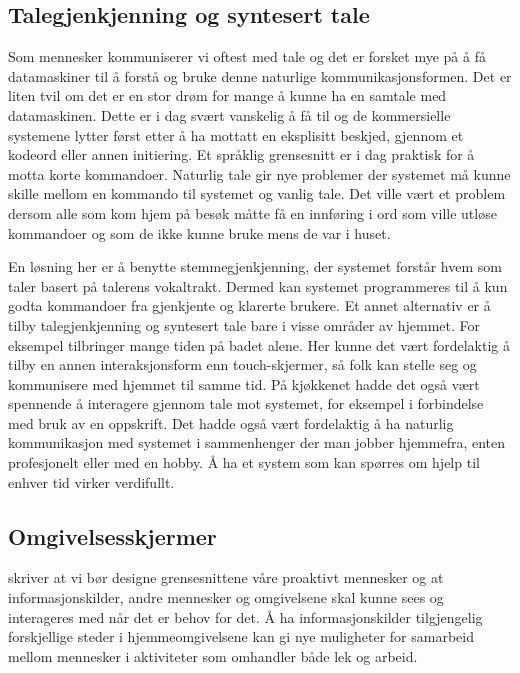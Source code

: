 \subsection*{Talegjenkjenning og syntesert tale}
Som mennesker kommuniserer vi oftest med tale og det er forsket mye på å få datamaskiner til å forstå og bruke denne naturlige kommunikasjonsformen. Det er liten tvil om det er en stor drøm for mange å kunne ha en samtale med datamaskinen. Dette er i dag svært vanskelig å få til og de kommersielle systemene lytter først etter å ha mottatt en eksplisitt beskjed, gjennom et kodeord eller annen initiering. Et språklig grensesnitt er i dag praktisk for å motta korte kommandoer. Naturlig tale gir nye problemer der systemet må kunne skille mellom en kommando til systemet og vanlig tale. Det ville vært et problem dersom alle som kom hjem på besøk måtte få en innføring i ord som ville utløse kommandoer og som de ikke kunne bruke mens de var i huset.

En løsning her er å benytte stemmegjenkjenning, der systemet forstår hvem som taler basert på talerens vokaltrakt. Dermed kan systemet programmeres til å kun godta kommandoer fra gjenkjente og klarerte brukere. Et annet alternativ er å tilby talegjenkjenning og syntesert tale bare i visse områder av hjemmet. For eksempel tilbringer mange tiden på badet alene. Her kunne det vært fordelaktig å tilby en annen interaksjonsform enn touch-skjermer, så folk kan stelle seg og kommunisere med hjemmet til samme tid. På kjøkkenet hadde det også vært spennende å interagere gjennom tale mot systemet, for eksempel i forbindelse med bruk av en oppskrift. Det hadde også vært fordelaktig å ha naturlig kommunikasjon med systemet i sammenhenger der man jobber hjemmefra, enten profesjonelt eller med en hobby. Å ha et system som kan spørres om hjelp til enhver tid virker verdifullt. 

\subsection*{Omgivelsesskjermer}
\citet{rogers06} skriver at vi bør designe grensesnittene våre proaktivt mennesker og at informasjonskilder, andre mennesker og omgivelsene skal kunne sees og interageres med når det er behov for det. Å ha informasjonskilder tilgjengelig forskjellige steder i hjemmeomgivelsene kan gi nye muligheter for samarbeid mellom mennesker i aktiviteter som omhandler både lek og arbeid.

